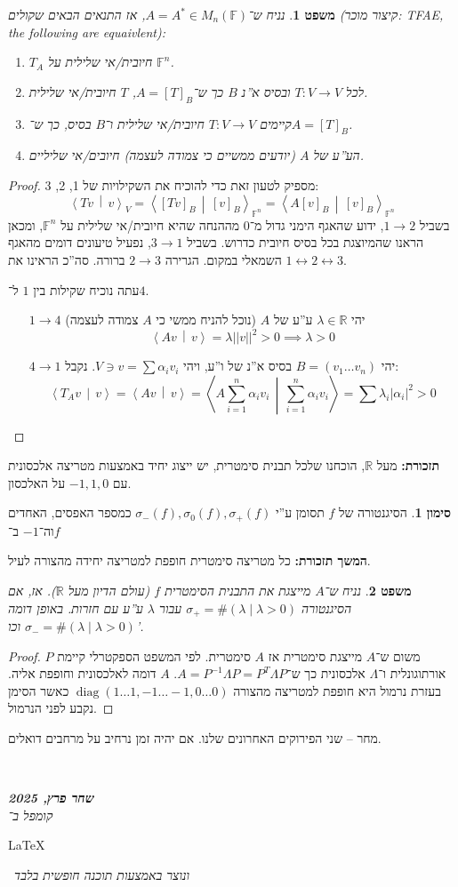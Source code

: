 \documentclass[]{article}
\newcommand\en[1] {\begin{otherlanguage}{english}#1\end{otherlanguage}}
\newcommand\ndoc  {\dotfill \\ \vfil {\begin{center}
			{\textbf{\textit{שחר פרץ, 2025}} \\
				\scriptsize \textit{קומפל ב־}\en{\LaTeX}\,\textit{ ונוצר באמצעות תוכנה חופשית בלבד}}
	\end{center}} \vfil	}
\newcommand\R     {\mathbb{R}}
\newcommand\ra    {\rangle}
\newcommand\la    {\langle}
\newcommand\sumnio    {\sum_{i = 1}^{n}}
\DeclareMathOperator{\diag}    {diag}
\newcommand\lra       {\leftrightarrow}
\newcommand\F         {\mathbb{F}}
\newcommand\co        {\colon}
\newcommand\norm[1]   {\left \vert \left \vert #1 \right \vert \right \vert}
\newcommand\mut[2]    {\left \la #1 \,\middle\vert\, #2 \right \ra}
\newcommand\ag        {\alpha}
\renewcommand\lg      {\lambda}
\newcommand\sg        {\sigma}
\newcommand\Lg        {\Lambda}
\newcommand\op    {^{-1}}
\newtheorem{Theorem}{משפט}
\theoremstyle{definition}
\newtheorem{Notion}{סימון}
\newcommand\theo  [1] {\begin{Theorem}#1\end{Theorem}}
\newcommand\noti  [1] {\begin{Notion}#1\end{Notion}}
\begin{document}
	\theo{נניח ש־$A = A^* \in M_n(\F)$, אז התנאים הבאים שקולים (קיצור מוכר: TFAE, the following are equaivlent): 
	\begin{enumerate}
		\item $T_A$ חיובית/אי שלילית על $\F^n$. 
		\item לכל $T \co V \to V$ ובסיס א''נ $B$ כך ש־$A = [T]_B$, $T$ חיובית/אי שלילית. 
		\item קיימים $T \co V \to V$ חיובית/אי שלילית ו־$B$ בסיס, כך ש־$A = [T]_B$. 
		\item הע''ע של $A$ (יודעים ממשיים כי צמודה לעצמה) חיובים/אי שליליים. 
	\end{enumerate}}
	\begin{proof}
		מספיק לטעון זאת כדי להוכיח את השקילויות של 1, 2, 3: 
		\[ \mut{Tv}{v}_V = \mut{[Tv]_B}{[v]_B}_{\F^n} = \mut{A[v]_B}{[v]_B}_{\F^n} \]
		בשביל $1 \to 2$, ידוע שהאגף הימני גדול מ־$0$ מההנחה שהיא חיובית/אי שלילית על $\F^n$, ומכאן הראנו שהמיוצגת בכל בסיס חיובית כדרוש. בשביל $3 \to 1$, נפעיל טיעונים דומים מהאגף השמאלי במקום. הגרירה $2 \to 3$ ברורה. סה''כ הראינו את $1\lra2\lra 3$. 
		
		עתה נוכיח שקילות בין $1$ ל־$4$. 
		\begin{itemize}
			\item[$1 \to 4$] יהי $\lg \in \R$ ע''ע של $A$ (נוכל להניח ממשי כי $A$ צמודה לעצמה)
			\[ \mut{Av}{v} = \lg\norm{v}^2 > 0 \implies \lg > 0 \]
			\item[$4 \to 1$] יהי $B = (v_1 \dots v_n)$ בסיס א''נ של ו''ע, ויהי $V \ni v = \sum \ag_i v_i$. נקבל: 
			\[ \mut{T_Av}{v} = \mut{Av}{v} = \mut{A\sumnio \ag_i v_i}{\sumnio \ag_i v_i} = \sum \lg_i |\ag_i|^2 > 0 \]
		\end{itemize}
	\end{proof}
	
	\textbf{תזכורת: }מעל $\R$, הוכחנו שלכל תבנית סימטרית, יש ייצוג יחיד באמצעות מטריצה אלכסונית עם $-1, 1, 0$ על האלכסון. 
	\noti{הסיגנטורה של $f$ תסומן ע''י $\sg_-(f), \sg_0(f), \sg_+(f)$ כמספר האפסים, האחדים וה־$-1$ ב־$f$}
	
	\textbf{המשך תזכורת: }כל מטריצה סימטרית חופפת למטריצה יחידה מהצורה לעיל. 
	
	\theo{נניח ש־$A$ מייצגת את התבנית הסימטרית $f$ (עולם הדיון מעל $\R$). אז, אם הסיגנטורה $\sg_+ = \#(\lg \mid \lg > 0)$ עבור $\lg$ ע''ע עם חזרות. באופן דומה $\sg_- = \#(\lg \mid \lg > 0)$ וכו'. }
	
	\begin{proof}
		משום ש־$A$ מייצגת סימטרית אז $A$ סימטרית. לפי המשפט הספקטרלי קיימת $P$ אורתוגונלית ו־$\Lg$ אלכסונית כך ש־$A = P\op\Lg P = P^T\Lg P$. $A$ דומה לאלכסונית וחופפת אליה. בעזרת נרמול היא חופפת למטריצה מהצורה $\diag(1 \dots 1, -1 \ldots -1, 0 \ldots 0)$ כאשר הסימן נקבע לפני הנרמול. 
	\end{proof}
	
	מחר – שני הפירוקים האחרונים שלנו. אם יהיה זמן נרחיב על מרחבים דואלים. 
	
	
	
	\ndoc
\end{document}
